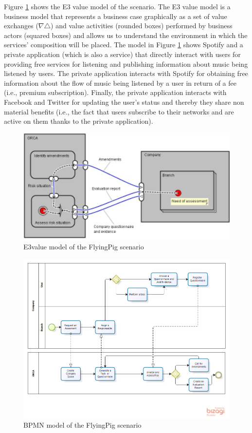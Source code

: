 Figure \ref{fig:E3valuemodel} shows the E3 value model \cite{e3value} of
the scenario. The E3 value model is a business model that represents a business case graphically as a set of value exchanges ($\nabla$$\triangle$) and value activities (rounded boxes) performed by business actors (squared boxes) and allows us to understand the environment in which the services' composition will be placed. 
The model in Figure \ref{fig:E3valuemodel} shows Spotify and a private application (which is also a service) that directly interact with users for providing free services for listening and publishing information about music being listened by users. The private application interacts with Spotify for obtaining free information about the flow of music being listened by a user in return of a fee (i.e., premium subscription). Finally, the private application interacts with Facebook and Twitter for updating the user's status and thereby they share non material benefits (i.e., the fact that users subscribe to their networks and are active on them thanks to the private application).


\begin{figure}
\centering
\includegraphics[width=1\textwidth]{figs/ValueModel_GCP}
\caption{E3value model of the FlyingPig scenario}
\label{fig:E3valuemodel}
\end{figure}


\begin{figure}
\centering
\includegraphics[width=1\textwidth]{figs/BPMN_GCP.png}
\caption{BPMN model of the FlyingPig scenario}
\label{fig:bpmn}
\end{figure}

